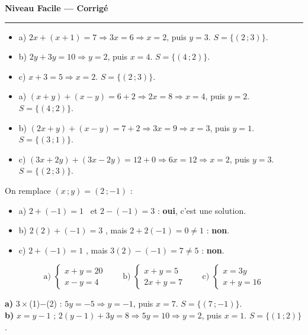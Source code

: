 \documentclass[11pt,a4paper]{article}
\begin{document}
\begin{center}
{\LARGE\bfseries\color{primarydark} Niveau Facile — Corrigé}\\[2pt]
{\color{primary}\rule{0.45\textwidth}{1.2pt}}
\end{center}
\vspace{1mm}

\begin{corrige}[substitution]
\begin{itemize}[leftmargin=1.4em,topsep=1pt,itemsep=1pt]
  \item a) $2x+(x+1)=7\Rightarrow 3x=6\Rightarrow x=2$, puis $y=3$. $S=\{(2\,;3)\}$.
  \item b) $2y+3y=10\Rightarrow y=2$, puis $x=4$. $S=\{(4\,;2)\}$.
  \item c) $x+3=5\Rightarrow x=2$. $S=\{(2\,;3)\}$.
\end{itemize}
\end{corrige}

\begin{corrige}[combinaison]
\begin{itemize}[leftmargin=1.4em,topsep=1pt,itemsep=1pt]
  \item a) $(x+y)+(x-y)=6+2\Rightarrow 2x=8\Rightarrow x=4$, puis $y=2$. $S=\{(4\,;2)\}$.
  \item b) $(2x+y)+(x-y)=7+2\Rightarrow 3x=9\Rightarrow x=3$, puis $y=1$. $S=\{(3\,;1)\}$.
  \item c) $(3x+2y)+(3x-2y)=12+0\Rightarrow 6x=12\Rightarrow x=2$, puis $y=3$. $S=\{(2\,;3)\}$.
\end{itemize}
\end{corrige}

\begin{corrige}
On remplace $(x\,;y)=(2\,;-1)$ :
\begin{itemize}[leftmargin=1.4em,topsep=1pt,itemsep=1pt]
  \item a) $2+(-1)=1$ \checkmark \ et $2-(-1)=3$ \checkmark : \textbf{oui}, c'est une solution.
  \item b) $2(2)+(-1)=3$ \checkmark, mais $2+2(-1)=0\neq1$ : \textbf{non}.
  \item c) $2+(-1)=1$ \checkmark, mais $3(2)-(-1)=7\neq5$ : \textbf{non}.
\end{itemize}
\end{corrige}

\begin{corrige}
\[ \text{a) }\begin{cases} x+y=20\\ x-y=4\end{cases}\qquad
   \text{b) }\begin{cases} x+y=5\\ 2x+y=7\end{cases}\qquad
   \text{c) }\begin{cases} x=3y\\ x+y=16\end{cases} \]
\end{corrige}

\begin{corrige}
\textbf{a)} $3\times$(1)$-$(2) : $5y=-5\Rightarrow y=-1$, puis $x=7$. $S=\{(7\,;-1)\}$.\\
\textbf{b)} $x=y-1$ ; $2(y-1)+3y=8\Rightarrow 5y=10\Rightarrow y=2$, puis $x=1$. $S=\{(1\,;2)\}$.
\end{corrige}
\end{document}
